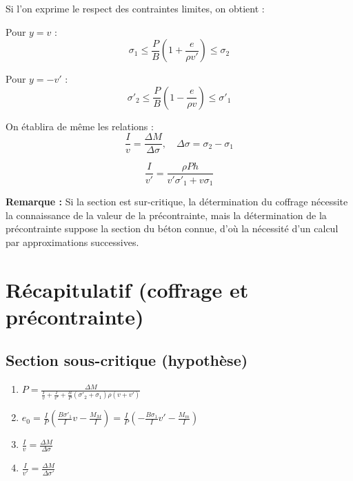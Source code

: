 \documentclass[12pt,a4paper]{article}
\begin{document}
Si l'on exprime le respect des contraintes limites, on obtient :

Pour $y = v$ :
\begin{equation}
\sigma_1 \leq \frac{P}{B} \left( 1 + \frac{e}{\rho v'} \right) \leq \sigma_2
\end{equation}

Pour $y = -v'$ :
\begin{equation}
\sigma'_2 \leq \frac{P}{B} \left( 1 - \frac{e}{\rho v} \right) \leq \sigma'_1
\end{equation}

On établira de même les relations :
\begin{equation}
\frac{I}{v} = \frac{\Delta M}{\Delta \sigma}, \quad \Delta \sigma = \sigma_2 - \sigma_1
\end{equation}

\begin{equation}
\frac{I}{v'} = \frac{\rho Ph}{v'\sigma'_1 + v\sigma_1}
\end{equation}

\begin{warningbox}
\textbf{Remarque :} Si la section est sur-critique, la détermination du coffrage nécessite la connaissance de la valeur de la précontrainte, mais la détermination de la précontrainte suppose la section du béton connue, d'où la nécessité d'un calcul par approximations successives.
\end{warningbox}

\section{Récapitulatif (coffrage et précontrainte)}

\subsection{Section sous-critique (hypothèse)}

\begin{enumerate}
    \item $P = \frac{\Delta M}{\frac{I}{v} + \frac{I}{v'} + \frac{B}{P}(\sigma'_2 + \sigma_1)\rho(v+v')}$
    \item $e_0 = \frac{I}{P}\left(\frac{B\sigma'_1}{I}v - \frac{M_M}{I}\right) = \frac{I}{P}\left(-\frac{B\sigma_1}{I}v' - \frac{M_m}{I}\right)$
    \item $\frac{I}{v} = \frac{\Delta M}{\Delta \sigma}$
    \item $\frac{I}{v'} = \frac{\Delta M}{\Delta \sigma'}$
\end{enumerate}
\end{document}
